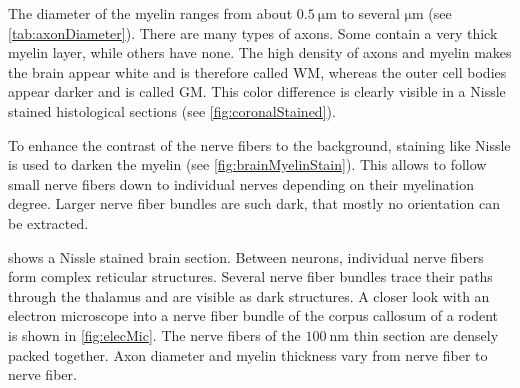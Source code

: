 The diameter of the myelin ranges from about $\SI{0.5}{\micro\meter}$ to several $\si{\micro\meter}$ (see \cref{tab:axonDiameter}).
There are many types of axons.
Some contain a very thick myelin layer, while others have none.
The high density of axons and myelin makes the brain appear white and is therefore called \ac{WM}, whereas the outer cell bodies appear darker and is called \ac{GM}.
This color difference is clearly visible in a Nissle stained histological sections (see \cref{fig:coronalStained}).
\par
%
To enhance the contrast of the nerve fibers to the background, staining like Nissle is used to darken the myelin (see \cref{fig:brainMyelinStain}).
This allows to follow small nerve fibers down to individual nerves depending on their myelination degree.
Larger nerve fiber bundles are such dark, that mostly no orientation can be extracted.
\par
% 
 shows a Nissle stained brain section.
Between neurons, individual nerve fibers form complex reticular structures.
Several nerve fiber bundles trace their paths through the thalamus and are visible as dark structures.
% 
A closer look with an electron microscope into a nerve fiber bundle of the corpus callosum of a rodent is shown in \cref{fig:elecMic}.
The nerve fibers of the $\SI{100}{\nano\meter}$ thin section are densely packed together.
Axon diameter and myelin thickness vary from nerve fiber to nerve fiber.
% 
